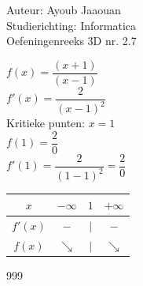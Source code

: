 \documentclass[a4paper]{article}
\begin{document}
\noindent \large Auteur: Ayoub Jaaouan \\
\noindent \large Studierichting: Informatica\\
\noindent \large Oefeningenreeks 3D nr. 2.7\\

\medskip

\normalsize

$f(x) = \dfrac{(x+1)}{(x-1)}$ \\

$f'(x) = \dfrac{2}{(x-1)^2}$ \\

Kritieke punten: $x = 1$ \\

$f(1) = \dfrac{2}{0}   $ \\

$f'(1) = \dfrac{2}{(1-1)^2} = \dfrac{2}{0}  $ \\




\begin{tabular}{c|ccc}
        $x$     & $-\infty$ & $1$ & $+\infty$\\ 
        \hline
        $f'(x)$ & $-$       & $|$ & $-$        \\ 
        \hline
        $f(x)$  &$\searrow$ &$|$ & $\searrow$ \\
\end{tabular}







\begin{thebibliography}{999}
\end{thebibliography}
\end{document}
